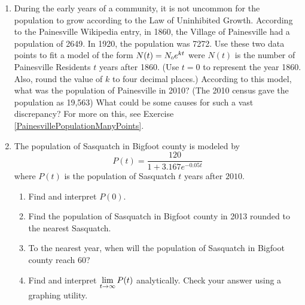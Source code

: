 \documentclass{ximera}
\begin{document}
\begin{enumerate}
\item  \label{PainesvillePopulationTwoPoint} During the early years of a community, it is not uncommon for the population to grow according to the Law of Uninhibited Growth.  According to the Painesville Wikipedia entry, in 1860, the Village of Painesville had a population of 2649.  In 1920, the population was 7272.  Use these two data points to fit a model of the form $N(t) = N_{\text{\tiny $0$}} e^{kt}$ were $N(t)$ is the number of Painesville Residents $t$ years after 1860.  (Use $t = 0$ to represent the year 1860.  Also, round the value of $k$ to four decimal places.)  According to this model, what was the population of Painesville in 2010?  (The 2010 census gave the population as 19,563) What could be some causes for such a vast discrepancy?  For more on this, see Exercise \ref{PainesvillePopulationManyPoints}.

\item  The population of Sasquatch in Bigfoot county is modeled by \[P(t) = \dfrac{120}{1 + 3.167e^{-0.05t}}\] where $P(t)$ is the population of Sasquatch $t$ years after $2010$.

\begin{enumerate}

\item  Find and interpret $P(0)$.

\item  Find the population of Sasquatch in Bigfoot county in 2013 rounded to the nearest Sasquatch.

\item  To the nearest year, when will the population of Sasquatch in Bigfoot county reach 60?  

\item   Find and interpret  $\ds{\lim_{t \rightarrow \infty} P(t)}$ analytically. Check your answer using a graphing utility. 

\end{enumerate}

\setcounter{HW}{\value{enumi}}
\end{enumerate}
\end{document}
